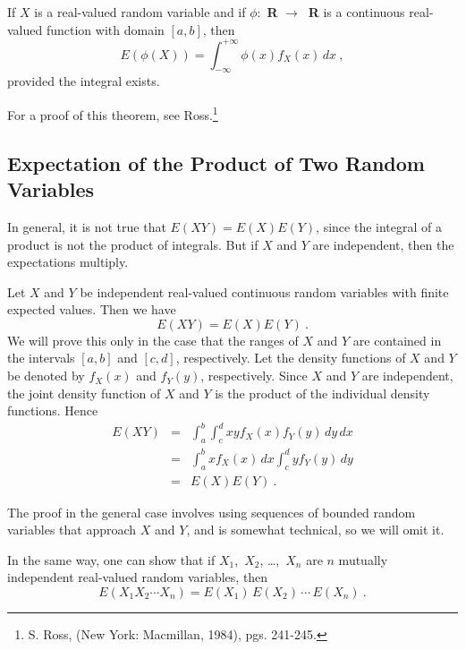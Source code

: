 {\begin{theorem}\label{thm 6.11} If $X$ is a real-valued random variable and if
$\phi :$ {\bf R} $\to\ $  {\bf R}  is a continuous real-valued function with domain
$[a,b]$, then 
$$ E(\phi(X)) = \int_{-\infty}^{+\infty} \phi(x) f_X(x)\, dx\ ,
$$ provided the integral exists.
\end{theorem}

For a proof of this theorem, see Ross.\footnote{S. Ross,   (New York: Macmillan, 1984), pgs. 241-245.}



\subsection*{Expectation of the Product of Two Random Variables}

In general, it is not true that $E(XY) = E(X)E(Y)$, since the integral of a product
is not the product of integrals.  But if $X$ and $Y$ are independent, then the
expectations multiply.

\begin{theorem}\label{thm 6.12} Let $X$ and $Y$ be independent real-valued continuous
random variables with finite expected values.  Then we have 
$$ E(XY) = E(X)E(Y)\ .
$$
\proof We will prove this only in the case that the ranges of $X$ and $Y$ are contained in
the intervals $[a, b]$ and $[c, d]$, respectively.  Let the density functions of $X$ and $Y$ be
denoted by $f_X(x)$ and $f_Y(y)$, respectively.  Since $X$ and $Y$ are independent, the joint
density function of $X$ and $Y$ is the product of the individual density functions.  Hence
\begin{eqnarray*} E(XY) & = & \int_a^b \int_c^d xy f_X(x) f_Y(y)\, dy\,dx \\
      & = & \int_a^b x f_X(x)\, dx \int_c^d y f_Y(y)\, dy \\
      & = & E(X)E(Y)\ .
\end{eqnarray*}
\par
The proof in the general case involves using sequences of bounded random variables that approach $X$
and $Y$, and is somewhat technical, so we will omit it.
\end{theorem}

In the same way, one can show that if $X_1$,~$X_2$, \dots,~$X_n$ are $n$ mutually
independent real-valued random variables, then
$$ 
E(X_1 X_2 \cdots X_n) = E(X_1)\,E(X_2)\,\cdots\,E(X_n)\ .
$$

}
